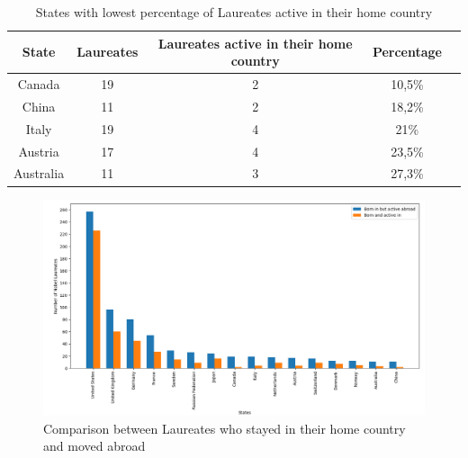 \documentclass{article}
\begin{document}
\begin{table}[h!]
	\centering
	\caption{States with lowest percentage of Laureates active in their home country}
	\begin{tabular}{|c|c|c|c|c|}
		\hline
		\textbf{State} & \textbf{Laureates} & \textbf{Laureates active in their home country} & \textbf{Percentage} \\ \hline
		Canada         & 19                 & 2                                               & 10,5\%              \\ \hline
		China          & 11                 & 2                                               & 18,2\%              \\ \hline
		Italy          & 19                 & 4                                               & 21\%                \\ \hline
		Austria        & 17                 & 4                                               & 23,5\%              \\ \hline
		Australia      & 11                 & 3                                               & 27,3\%              \\ \hline
	\end{tabular}
	\label{tab:laureates_active}
\end{table}

\begin{figure}[H]
	\centering
	\includegraphics[width=\textwidth]{../queries/plots/laureatesComparison.png}
	\caption{Comparison between Laureates who stayed in their home country and moved abroad}
	\label{fig:laureatesComparison}
\end{figure}
\end{document}

